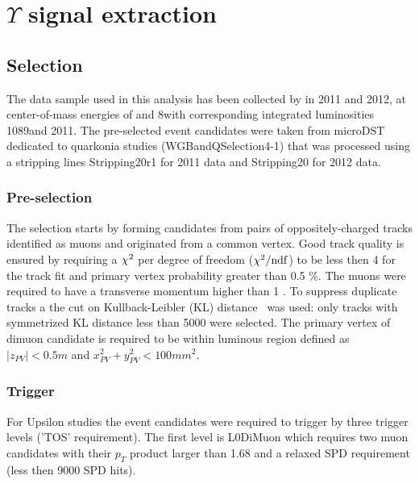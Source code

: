 \section{\texorpdfstring{$\Upsilon$}{Y} signal extraction}
\label{sec:upsilon}

\subsection{Selection}
\label{sec:ups:selelection}

The data sample used in this analysis has been collected by \lhcb in 2011 and
2012, at center-of-mass energies of \tev and 8\tev with corresponding
integrated luminosities  1089\invpb and 2011\invpb.
The pre-selected event candidates were taken from microDST dedicated to
quarkonia studies (WGBandQSelection4-1) that was processed using a 
stripping lines Stripping20r1 for 2011 data and Stripping20 for 2012 data.

\subsubsection{Pre-selection}
\label{sec:upsilon:selelection:preselection}

The selection starts by forming candidates from pairs of oppositely-charged
tracks identified as muons and originated from a common vertex.
Good track quality is ensured by requiring a $\chi^2$ per degree of
freedom ($\chi^2/\rm{ndf}$) to be less then 4 for the track fit and primary
vertex probability greater than 0.5 \%.
The muons were required to have a transverse momentum higher than 1 \gev.
To suppress  duplicate tracks  a the cut on Kullback-Leibler (KL)
distance~\cite{Needham:1082460} was used: only tracks with symmetrized KL distance less
than 5000 were selected.
The primary vertex of dimuon candidate is required to be within luminous region
defined as $|z_{PV}| < 0.5 m$ and $x_{PV}^2 + y_{PV}^2 < 100 mm^2$.

\subsubsection{Trigger}
\label{sec:upsilon:selection:trigger}

For Upsilon studies the event candidates  were required to trigger by three
trigger levels ('TOS' requirement). The first level is L0DiMuon which  requires
two muon candidates with their $p_T$ product larger than 1.68 \gevcc and
a relaxed SPD requirement (less then 9000 SPD hits).

